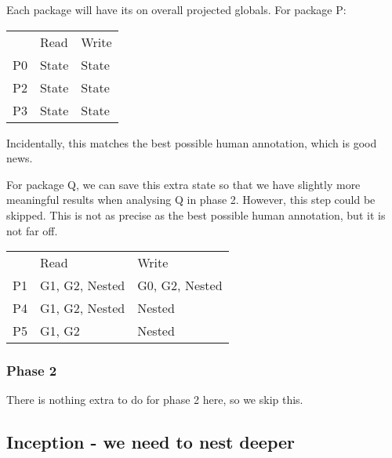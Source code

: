 \documentclass{article}
\begin{document}
\noindent
Each package will have its on overall projected globals. For package P:

\begin{center}
  \begin{tabular}{lll}
       & Read           & Write              \\
    P0 & State          & State              \\
    P2 & State          & State              \\
    P3 & State          & State              \\
  \end{tabular}
\end{center}

\noindent
Incidentally, this matches the best possible human annotation, which is
good news.

\pagebreak
\noindent
For package Q, we can save this extra state so that we have slightly more
meaningful results when analysing Q in phase 2. However, this step could be
skipped. This is not as precise as the best possible human annotation, but
it is not far off.

\begin{center}
  \begin{tabular}{lll}
       & Read           & Write              \\
    P1 & G1, G2, Nested & G0, G2, Nested     \\
    P4 & G1, G2, Nested & Nested             \\
    P5 & G1, G2         & Nested             \\
  \end{tabular}
\end{center}

\subsubsection{Phase 2}
There is nothing extra to do for phase 2 here, so we skip this.

\newpage
\subsection{Inception - we need to nest deeper}
\end{document}
